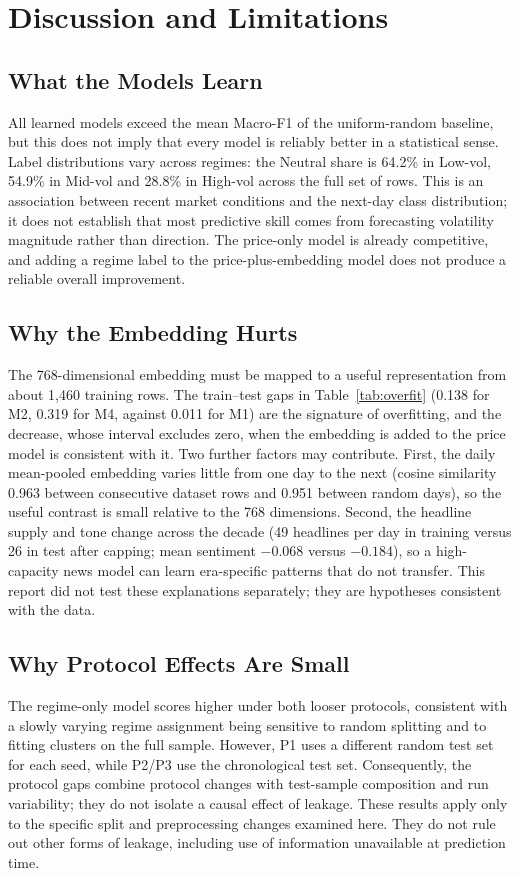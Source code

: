 \newpage
\section{Discussion and Limitations}\label{ch:discussion}
\subsection{What the Models Learn}
All learned models exceed the mean Macro-F1 of the uniform-random baseline, but this does not imply that every model is reliably better in a statistical sense. Label distributions vary across regimes: the Neutral share is 64.2\% in Low-vol, 54.9\% in Mid-vol and 28.8\% in High-vol across the full set of rows. This is an association between recent market conditions and the next-day class distribution; it does not establish that most predictive skill comes from forecasting volatility magnitude rather than direction. The price-only model is already competitive, and adding a regime label to the price-plus-embedding model does not produce a reliable overall improvement.

\subsection{Why the Embedding Hurts}
The 768-dimensional embedding must be mapped to a useful representation from about 1{,}460 training rows. The train--test gaps in Table~\ref{tab:overfit} (0.138 for M2, 0.319 for M4, against 0.011 for M1) are the signature of overfitting, and the decrease, whose interval excludes zero, when the embedding is added to the price model is consistent with it. Two further factors may contribute. First, the daily mean-pooled embedding varies little from one day to the next (cosine similarity 0.963 between consecutive dataset rows and 0.951 between random days), so the useful contrast is small relative to the 768 dimensions. Second, the headline supply and tone change across the decade (49 headlines per day in training versus 26 in test after capping; mean sentiment $-0.068$ versus $-0.184$), so a high-capacity news model can learn era-specific patterns that do not transfer. This report did not test these explanations separately; they are hypotheses consistent with the data.

\subsection{Why Protocol Effects Are Small}
The regime-only model scores higher under both looser protocols, consistent with a slowly varying regime assignment being sensitive to random splitting and to fitting clusters on the full sample. However, P1 uses a different random test set for each seed, while P2/P3 use the chronological test set. Consequently, the protocol gaps combine protocol changes with test-sample composition and run variability; they do not isolate a causal effect of leakage. These results apply only to the specific split and preprocessing changes examined here. They do not rule out other forms of leakage, including use of information unavailable at prediction time.

